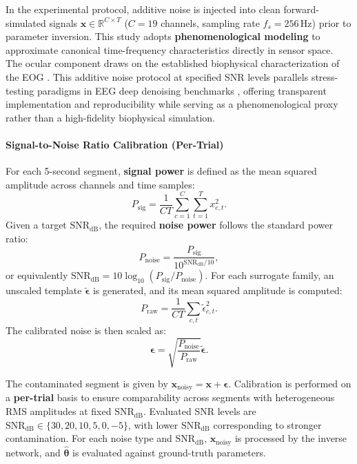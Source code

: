 \documentclass[11pt]{article}
\begin{document}
In the experimental protocol, additive noise is injected into clean forward-simulated signals $\mathbf{x} \in \mathbb{R}^{C \times T}$ ($C=19$ channels, sampling rate $f_s=256\,\mathrm{Hz}$) prior to parameter inversion. This study adopts \textbf{phenomenological modeling} to approximate canonical time-frequency characteristics directly in sensor space. The ocular component draws on the established biophysical characterization of the EOG \citep{elbert1985removal}. This additive noise protocol at specified SNR levels parallels stress-testing paradigms in EEG deep denoising benchmarks \citep{zhang2021eegdenoisenet}, offering transparent implementation and reproducibility while serving as a phenomenological proxy rather than a high-fidelity biophysical simulation.

\paragraph{Signal-to-Noise Ratio Calibration (Per-Trial)}
For each 5-second segment, \textbf{signal power} is defined as the mean squared amplitude across channels and time samples:
\begin{equation}
P_{\mathrm{sig}} = \frac{1}{CT} \sum_{c=1}^C \sum_{t=1}^T x_{c,t}^2. \tag{S6.1}\label{eq:supp_psig}
\end{equation}
Given a target \(\mathrm{SNR}_{\mathrm{dB}}\), the required \textbf{noise power} follows the standard power ratio:
\begin{equation}
P_{\mathrm{noise}} = \frac{P_{\mathrm{sig}}}{10^{\mathrm{SNR}_{\mathrm{dB}} / 10}}, \tag{S6.2}\label{eq:supp_pnoise}
\end{equation}
or equivalently \(\mathrm{SNR}_{\mathrm{dB}} = 10\log_{10}(P_{\mathrm{sig}}/P_{\mathrm{noise}})\). For each surrogate family, an unscaled template \(\tilde{\boldsymbol{\epsilon}}\) is generated, and its mean squared amplitude is computed:
\begin{equation}
P_{\mathrm{raw}} = \frac{1}{CT} \sum_{c,t} \tilde{\epsilon}_{c,t}^2. \tag{S6.3}\label{eq:supp_praw}
\end{equation}
The calibrated noise is then scaled as:
\begin{equation}
\boldsymbol{\epsilon} = \sqrt{\frac{P_{\mathrm{noise}}}{P_{\mathrm{raw}}}} \tilde{\boldsymbol{\epsilon}}. \tag{S6.4}\label{eq:supp_noise_scale}
\end{equation}

The contaminated segment is given by \(\mathbf{x}_{\mathrm{noisy}} = \mathbf{x} + \boldsymbol{\epsilon}\). Calibration is performed on a \textbf{per-trial} basis to ensure comparability across segments with heterogeneous RMS amplitudes at fixed \(\mathrm{SNR}_{\mathrm{dB}}\). Evaluated SNR levels are \(\mathrm{SNR}_{\mathrm{dB}}\in\{30,20,10,5,0,-5\}\), with lower \(\mathrm{SNR}_{\mathrm{dB}}\) corresponding to stronger contamination. For each noise type and \(\mathrm{SNR}_{\mathrm{dB}}\), \(\mathbf{x}_{\mathrm{noisy}}\) is processed by the inverse network, and \(\hat{\boldsymbol{\theta}}\) is evaluated against ground-truth parameters.
\end{document}
